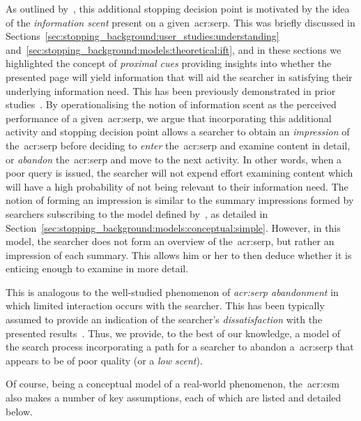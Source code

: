 As outlined by~\cite{maxwell2018serp}, this additional stopping decision point is motivated by the idea of the \emph{information scent} present on a given~\gls{acr:serp}. This was briefly discussed in Sections~\ref{sec:stopping_background:user_studies:understanding} and~\ref{sec:stopping_background:models:theoretical:ift}, and in these sections we highlighted the concept of \emph{proximal cues} providing insights into whether the presented page will yield information that will aid the searcher in satisfying their underlying information need. This has been previously demonstrated in prior studies~\citep{wu2014information_scent, ong2017scent_behaviour, maxwell2017snippets}. By operationalising the notion of information scent as the perceived performance of a given~\gls{acr:serp}, we argue that incorporating this additional activity and stopping decision point allows a searcher to obtain an \emph{impression} of the~\gls{acr:serp} before deciding to \emph{enter} the~\gls{acr:serp} and examine content in detail, or \emph{abandon} the~\gls{acr:serp} and move to the next activity. In other words, when a poor query is issued, the searcher will not expend effort examining content which will have a high probability of not being relevant to their information need. The notion of forming an impression is similar to the summary impressions formed by searchers subscribing to the model defined by~\cite{thomas2014modelling_behaviour}, as detailed in Section~\ref{sec:stopping_background:models:conceptual:simple}. However, in this model, the searcher does not form an overview of the~\gls{acr:serp}, but rather an impression of each summary. This allows him or her to then deduce whether it is enticing enough to examine in more detail.

This is analogous to the well-studied phenomenon of \emph{\gls{acr:serp} abandonment} in which limited interaction occurs with the searcher. This has been typically assumed to provide an indication of the searcher's \emph{dissatisfaction} with the presented results~\citep{dassarma2008serp_abandonment, chuklin2012serp_abandonment}. Thus, we provide, to the best of our knowledge, a model of the search process incorporating a path for a searcher to abandon a~\gls{acr:serp} that appears to be of poor quality (or a \emph{low scent}).

\noindent
{} Of course, being a conceptual model of a real-world phenomenon, the~\gls{acr:csm} also makes a number of key assumptions, each of which are listed and detailed below.

